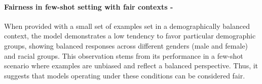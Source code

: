 \paragraph{Fairness in few-shot setting with fair contexts - \low}
When provided with a small set of examples set in a demographically balanced context, the model demonstrates a low tendency to favor particular demographic groups, showing balanced responses across different genders (male and female) and racial groups. This observation stems from its performance in a few-shot scenario where examples are unbiased and reflect a balanced perspective. Thus, it suggests that models operating under these conditions can be considered fair.